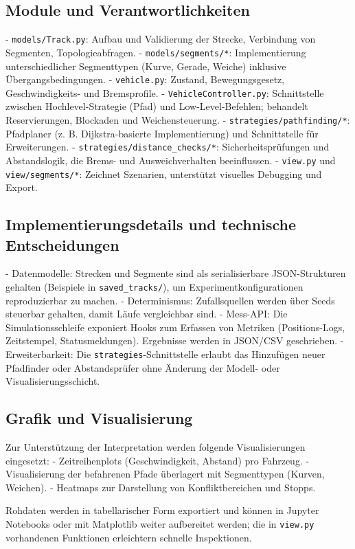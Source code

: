 \subsection*{Module und Verantwortlichkeiten}
- \texttt{models/Track.py}: Aufbau und Validierung der Strecke, Verbindung von Segmenten, Topologieabfragen.
- \texttt{models/segments/*}: Implementierung unterschiedlicher Segmenttypen (Kurve, Gerade, Weiche) inklusive Übergangsbedingungen.
- \texttt{vehicle.py}: Zustand, Bewegungsgesetz, Geschwindigkeits- und Bremsprofile.
- \texttt{VehicleController.py}: Schnittstelle zwischen Hochlevel-Strategie (Pfad) und Low-Level-Befehlen; behandelt Reservierungen, Blockaden und Weichensteuerung.
- \texttt{strategies/pathfinding/*}: Pfadplaner (z. B. Dijkstra-basierte Implementierung) und Schnittstelle für Erweiterungen.
- \texttt{strategies/distance\_checks/*}: Sicherheitsprüfungen und Abstandslogik, die Brems- und Ausweichverhalten beeinflussen.
- \texttt{view.py} und \texttt{view/segments/*}: Zeichnet Szenarien, unterstützt visuelles Debugging und Export.

\subsection*{Implementierungsdetails und technische Entscheidungen}
- Datenmodelle: Strecken und Segmente sind als serialisierbare JSON-Strukturen gehalten (Beispiele in \texttt{saved\_tracks/}), um Experimentkonfigurationen reproduzierbar zu machen.
- Determinismus: Zufallsquellen werden über Seeds steuerbar gehalten, damit Läufe vergleichbar sind.
- Mess-API: Die Simulationsschleife exponiert Hooks zum Erfassen von Metriken (Positions-Logs, Zeitstempel, Statusmeldungen). Ergebnisse werden in JSON/CSV geschrieben.
- Erweiterbarkeit: Die \texttt{strategies}-Schnittstelle erlaubt das Hinzufügen neuer Pfadfinder oder Abstandsprüfer ohne Änderung der Modell- oder Visualisierungsschicht.

\subsection*{Grafik und Visualisierung}
Zur Unterstützung der Interpretation werden folgende Visualisierungen eingesetzt:
- Zeitreihenplots (Geschwindigkeit, Abstand) pro Fahrzeug.
- Visualisierung der befahrenen Pfade überlagert mit Segmenttypen (Kurven, Weichen).
- Heatmaps zur Darstellung von Konfliktbereichen und Stopps.

Rohdaten werden in tabellarischer Form exportiert und können in Jupyter Notebooks oder mit Matplotlib weiter aufbereitet werden; die in \texttt{view.py} vorhandenen Funktionen erleichtern schnelle Inspektionen.

